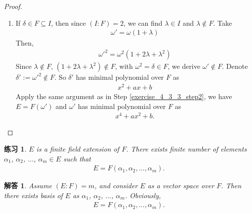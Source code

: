 \documentclass[utf8]{ctexbook}
\newtheorem{exercise}{练习}[section]
\newtheorem*{soln}{解答}
\begin{document}
\begin{proof}
\begin{itemize}
{\begin{enumerate}
{Since $(\theta + \dfrac{\beta}{2})^2 = \dfrac{\beta^2}{4} - \gamma$, which is $\\omega^2 = \delta $, the minimal polynomial of $\delta $ over $F$ shows $\omega^4 + a \omega^2 + b = 0$.

Notice $I = F(\delta)$ ({\color{red} by $\delta$ degree of $2$ over $F$?}), so $E = I(\omega)= F(\delta, \omega) = F(\omega)$ ({ \color{red} since $\delta$ is a polynomial of $\omega$, $\delta = \omega^2$?}).

By assumption, $(E:F)=4$, so $\omega$ has minimal polynomial over $F$ with degree of $4$, which is
\begin{align*}
x^4 + a x^2 + b
\end{align*}
}
\item{If $\delta \in F \subseteq I$, then since $(I:F)= 2$, we can find $\lambda \in I$ and $\lambda \not \in F$. Take
\begin{align*}
\omega' = \omega ( 1 + \lambda)
\end{align*}
Then,
\begin{align*}
\omega'^2 = \omega^2 ( 1+ 2 \lambda + \lambda^2 )
\end{align*}
Since $\lambda \not \in F$, $( 1+ 2 \lambda + \lambda^2 ) \not \in F$, with $\omega^2 = \delta \in F$, we derive $\omega' \not \in F$. Denote $\delta ' := \omega'^2 \not \in F$. So $\delta'$ has minimal polynomial over $F$ as
\begin{align*}
x^2 + a x + b
\end{align*}
Apply the same argument as in Step \ref{exercise_4_3_3_step2}, we have $E = F(\omega')$ and $\omega'$ has minimal polynomial over $F$ as
\begin{align*}
x^4 + ax^2 + b .
\end{align*}
}
\end{enumerate}
}
\end{itemize}
\end{proof}

\begin{exercise}
$E$ is a finite field extension of $F$. There exists finite number of elements $\alpha_1$, $\alpha_2$, $\ldots$, $\alpha_m \in E$ such that 
\begin{align*}
E = F(\alpha_1, \alpha_2, \ldots, \alpha_m ) .
\end{align*}
\end{exercise}

\begin{soln}
Assume $(E:F)=m$, and consider $E$ as a vector space over $F$. Then there exists basis of $E$ as $\alpha_1$, $\alpha_2$, $\ldots$, $\alpha_m$. Obviously,
\begin{align*}
E = F(\alpha_1, \alpha_2, \ldots, \alpha_m ) .
\end{align*}
\end{soln}
\end{document}
